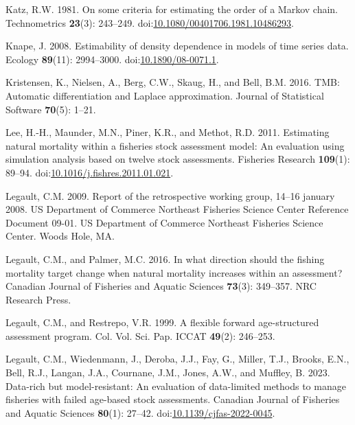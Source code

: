 \documentclass[
  12pt,
]{article}
\newlength{\cslhangindent}
\newlength{\cslentryspacingunit} %
\newenvironment{CSLReferences}[2] %
 {%
  \setlength{\parindent}{0pt}
  \ifodd #1
  \let\oldpar\par
  \def\par{\hangindent=\cslhangindent\oldpar}
  \fi
  \setlength{\parskip}{#2\cslentryspacingunit}
 }%
 {}
\begin{document}
\begin{CSLReferences}{1}{0}
\leavevmode{}%
Katz, R.W. 1981. On some criteria for estimating the order of a {M}arkov
chain. Technometrics \textbf{23}(3): 243--249.
doi:\href{https://doi.org/10.1080/00401706.1981.10486293}{10.1080/00401706.1981.10486293}.

\leavevmode{}%
Knape, J. 2008. Estimability of density dependence in models of time
series data. Ecology \textbf{89}(11): 2994--3000.
doi:\href{https://doi.org/10.1890/08-0071.1}{10.1890/08-0071.1}.

\leavevmode{}%
Kristensen, K., Nielsen, A., Berg, C.W., Skaug, H., and Bell, B.M. 2016.
{TMB}: Automatic differentiation and {L}aplace approximation. Journal of
Statistical Software \textbf{70}(5): 1--21.

\leavevmode{}%
Lee, H.-H., Maunder, M.N., Piner, K.R., and Methot, R.D. 2011.
Estimating natural mortality within a fisheries stock assessment model:
An evaluation using simulation analysis based on twelve stock
assessments. Fisheries Research \textbf{109}(1): 89--94.
doi:\href{https://doi.org/10.1016/j.fishres.2011.01.021}{10.1016/j.fishres.2011.01.021}.

\leavevmode{}%
Legault, C.M. 2009. Report of the retrospective working group, 14--16
january 2008. US Department of Commerce Northeast Fisheries Science
Center Reference Document 09-01. US Department of Commerce Northeast
Fisheries Science Center. Woods Hole, MA.

\leavevmode{}%
Legault, C.M., and Palmer, M.C. 2016. In what direction should the
fishing mortality target change when natural mortality increases within
an assessment? Canadian Journal of Fisheries and Aquatic Sciences
\textbf{73}(3): 349--357. NRC Research Press.

\leavevmode{}%
Legault, C.M., and Restrepo, V.R. 1999. A flexible forward
age-structured assessment program. Col. Vol. Sci. Pap. ICCAT
\textbf{49}(2): 246--253.

\leavevmode{}%
Legault, C.M., Wiedenmann, J., Deroba, J.J., Fay, G., Miller, T.J.,
Brooks, E.N., Bell, R.J., Langan, J.A., Cournane, J.M., Jones, A.W., and
Muffley, B. 2023. Data-rich but model-resistant: An evaluation of
data-limited methods to manage fisheries with failed age-based stock
assessments. Canadian Journal of Fisheries and Aquatic Sciences
\textbf{80}(1): 27--42.
doi:\href{https://doi.org/10.1139/cjfas-2022-0045}{10.1139/cjfas-2022-0045}.


\end{CSLReferences}
\end{document}
